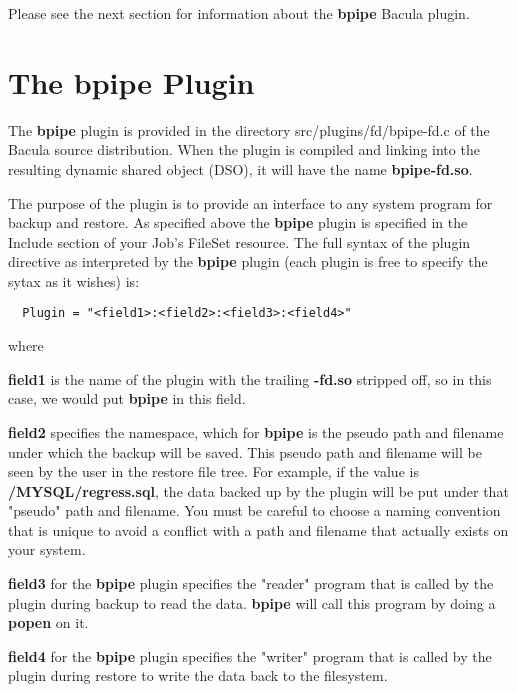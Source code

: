 Please see the next section for information about the {\bf bpipe} Bacula
plugin.

\section{The bpipe Plugin}
The {\bf bpipe} plugin is provided in the directory src/plugins/fd/bpipe-fd.c of
the Bacula source distribution. When the plugin is compiled and linking into
the resulting dynamic shared object (DSO), it will have the name {\bf bpipe-fd.so}.

The purpose of the plugin is to provide an interface to any system program for
backup and restore. As specified above the {\bf bpipe} plugin is specified in
the Include section of your Job's FileSet resource.  The full syntax of the
plugin directive as interpreted by the {\bf bpipe} plugin (each plugin is free
to specify the sytax as it wishes) is:

\begin{verbatim}
  Plugin = "<field1>:<field2>:<field3>:<field4>"
\end{verbatim}

where
\begin{description}
\item {\bf field1} is the name of the plugin with the trailing {\bf -fd.so}
stripped off, so in this case, we would put {\bf bpipe} in this field.

\item {\bf field2} specifies the namespace, which for {\bf bpipe} is the
pseudo path and filename under which the backup will be saved. This pseudo
path and filename will be seen by the user in the restore file tree.
For example, if the value is {\bf /MYSQL/regress.sql}, the data
backed up by the plugin will be put under that "pseudo" path and filename.
You must be careful to choose a naming convention that is unique to avoid
a conflict with a path and filename that actually exists on your system.

\item {\bf field3} for the {\bf bpipe} plugin 
specifies the "reader" program that is called by the plugin during
backup to read the data. {\bf bpipe} will call this program by doing a
{\bf popen} on it.

\item {\bf field4} for the {\bf bpipe} plugin
specifies the "writer" program that is called by the plugin during
restore to write the data back to the filesystem.  
\end{description}


